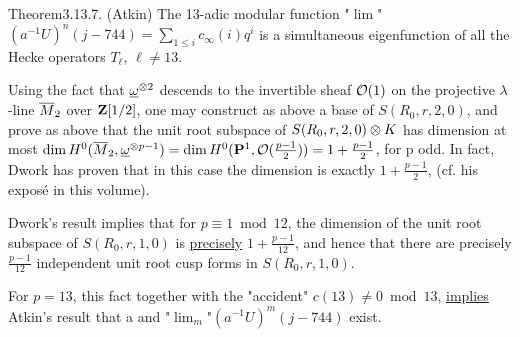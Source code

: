 \begin{kathm}{Theorem}{3.13.7.}
(Atkin) The 13-adic modular function "$\lim$"$(a^{-1}U)^n(j-744) =
\sum_{1\leq i} c_\infty(i)q^i$ is a simultaneous eigenfunction of all the Hecke
operators $T_\ell$, $\ell\neq 13$.
\end{kathm}

 Using the fact that $\underline{\omega}^{\otimes 2}$ descends to the invertible
sheaf $\mathcal{O}(1)$ on the projective $\lambda$-line $\overline{M}_2$ over $\mathbf{Z}[1/2]$, one
may construct as above a base of $S(R_0,r,2,0)$, and prove as above that the
unit root subspace of $S(R_0,r,2,0)\otimes K$ has dimension at most
$\dim H^0(\overline{M}_2,\underline{\omega}^{\otimes p-1}) = \dim H^0(\mathbf{P}^1,\mathcal{O}(\frac{p-1}{2})) =
1 + \frac{p-1}{2}$, for p odd. In fact, Dwork has proven that in this case the
dimension is exactly $1 + \frac{p-1}{2}$, (cf. his expos\'e in this volume).

 Dwork's result implies that for $p\equiv 1 \bmod 12$, the
dimension of the unit root subspace of $S(R_0,r,1,0)$ is \uline{precisely}
$1 + \frac{p-1}{12}$, and hence that there are precisely $\frac{p-1}{12}$
independent unit root cusp forms in $S(R_0,r,1,0)$.

For $p=13$, this fact together with the "accident" $c(13)\neq 0 \bmod 13$,
\uline{implies} Atkin's result that a and "$\lim_m$"$(a^{-1}U)^m(j-744)$ exist.

